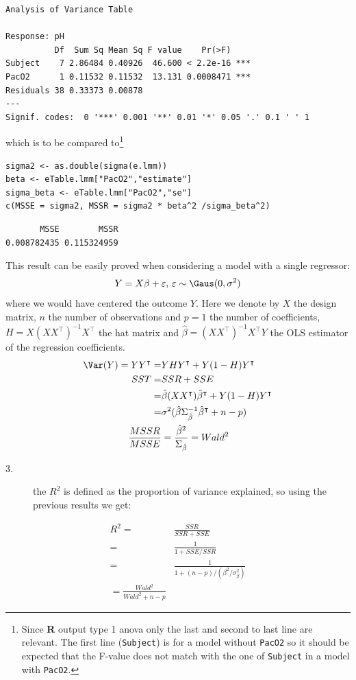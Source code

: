 \documentclass[12pt]{article}
\newcommand\Warning[1][3ex]{%
\renewcommand\stacktype{L}%
\scaleto{\stackon[1.3pt]{\color{red}$\triangle$}{\tiny\bfseries !}}{#1}%
\xspace
}
\newcommand\Rlogo{\textbf{\textsf{R}}\xspace} %
\newcommand\trans[1]{{#1}^\intercal}%
\begin{document}
\begin{verbatim}
Analysis of Variance Table

Response: pH
          Df  Sum Sq Mean Sq F value    Pr(>F)    
Subject    7 2.86484 0.40926  46.600 < 2.2e-16 ***
PacO2      1 0.11532 0.11532  13.131 0.0008471 ***
Residuals 38 0.33373 0.00878                      
---
Signif. codes:  0 '***' 0.001 '**' 0.01 '*' 0.05 '.' 0.1 ' ' 1
\end{verbatim}


which is to be compared to\footnote{\Warning Since \Rlogo output type 1 anova only the last and second to
last line are relevant. The first line (\texttt{Subject}) is for a model
without \texttt{PacO2} so it should be expected that the F-value does not
match with the one of \texttt{Subject} in a model with \texttt{PacO2}.}

\lstset{language=r,label= ,caption= ,captionpos=b,numbers=none}
\begin{lstlisting}
sigma2 <- as.double(sigma(e.lmm))
beta <- eTable.lmm["PacO2","estimate"]
sigma_beta <- eTable.lmm["PacO2","se"]
c(MSSE = sigma2, MSSR = sigma2 * beta^2 /sigma_beta^2)
\end{lstlisting}

\begin{verbatim}
       MSSE        MSSR 
0.008782435 0.115324959
\end{verbatim}


This result can be easily proved when considering a model with a single
regressor:
\[ Y = X\beta + \varepsilon\text{, } \varepsilon\sim\Gaus(0,\sigma^2)\]
where we would have centered the outcome \(Y\). Here we denote by
\(X\) the design matrix, \(n\) the number of observations and \(p=1\)
the number of coefficients, \(H = X (X\trans{X})^{-1} \trans{X}\) the
hat matrix and \(\widehat{\beta} = (X\trans{X})^{-1} \trans{X}Y\) the
OLS estimator of the regression coefficients.
\begin{align*}
\Var(Y) = Y\trans{Y} =& YH\trans{Y} + Y(1-H)\trans{Y} \\
SST =& SSR + SSE \\
    =& \hat{\beta} (X\trans{X}) \trans{\hat{\beta}} + Y (1-H) \trans{Y} \\
    =& \sigma^2 (\hat{\beta} \Sigma^{-1}_{\hat{\beta}} \trans{\hat{\beta}} + n-p) \\
\frac{MSSR}{MSSE} &= \frac{\hat{\beta}^2}{\Sigma_{\hat{\beta}}} = Wald^2
\end{align*}

\begin{description}
\item[{3.}] the \(R^2\) is defined as the proportion of variance explained, so
using the previous results we get:
\end{description}
\begin{align*}
R^2 =& \frac{SSR}{SSR + SSE} \\
    =& \frac{1}{1 + SSE/SSR} \\
    =& \frac{1}{1 + (n-p)/(\beta^2/\sigma^2_\beta)} \\
    = \frac{Wald^2}{Wald^2 + n-p}
\end{align*}
\end{document}
